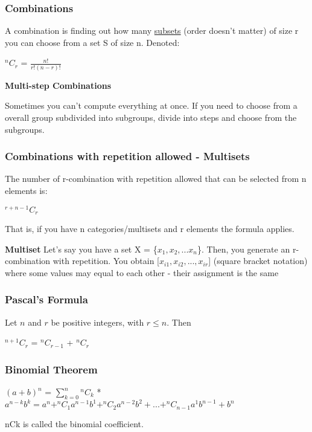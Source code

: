 \documentclass{article}
\newcommand{\sub}[1]{\vspace{10pt}\textbf{#1}}
\begin{document}
\subsubsection{Combinations}
A combination is finding out how many \underline{subsets} (order doesn't matter) of size r you can choose from a set S of size n. Denoted:
\begin{center}
    $^nC_r$ = $\frac{n!}{r!(n-r)!}$
\end{center}

\sub{Multi-step Combinations}

Sometimes you can't compute everything at once. If you need to choose from a overall group subdivided into subgroups, divide into steps and choose from the subgroups.

\subsubsection{Combinations with repetition allowed - Multisets}
The number of r-combination with repetition allowed that can be selected from n elements is:
\begin{center}
    $^{r+n-1}C_r$
\end{center}
That is, if you have n categories/multisets and r elements the formula applies.

\sub{Multiset}
Let's say you have a set X = \{$x_1, x_2, ... x_n$\}. Then, you generate an r-combination with repetition. You obtain [$x_{i1}, x_{i2}, ..., x_{ir}$] (square bracket notation) where some values may equal to each other - their assignment is the same

\subsubsection{Pascal's Formula}
Let $n$ and $r$ be positive integers, with $r\leq n$. Then
\begin{center}
    $^{n+1}C_r$ = $^nC_{r-1}$ + $^nC_r$
\end{center}

\subsubsection{Binomial Theorem}
\begin{center}
    $(a+b)^n$ = $\sum_{k=0}^{n}$$^nC_k$ * $a^{n-k}b^k = a^n + ^nC_1a^{n-1}b^1 + ^nC_2a^{n-2}b^2 + ... + ^nC_{n-1}a^1b^{n-1} + b^n$
\end{center}
nCk is called the binomial coefficient.
\end{document}
